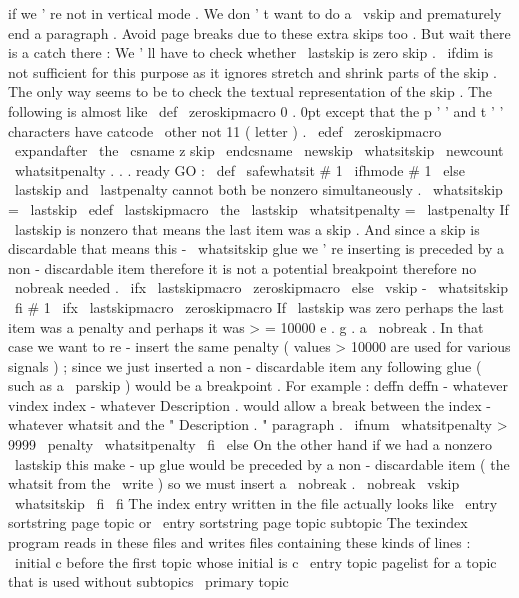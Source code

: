 {{{{if
we
'
re
not
in
vertical
mode
.
We
%
don
'
t
want
to
do
a
\
vskip
and
prematurely
end
a
paragraph
.
%
%
Avoid
page
breaks
due
to
these
extra
skips
too
.
%
%
But
wait
there
is
a
catch
there
:
%
We
'
ll
have
to
check
whether
\
lastskip
is
zero
skip
.
\
ifdim
is
not
%
sufficient
for
this
purpose
as
it
ignores
stretch
and
shrink
parts
%
of
the
skip
.
The
only
way
seems
to
be
to
check
the
textual
%
representation
of
the
skip
.
%
%
The
following
is
almost
like
\
def
\
zeroskipmacro
{
0
.
0pt
}
except
that
%
the
p
'
'
and
t
'
'
characters
have
catcode
\
other
not
11
(
letter
)
.
%
\
edef
\
zeroskipmacro
{
\
expandafter
\
the
\
csname
z
skip
\
endcsname
}
%
\
newskip
\
whatsitskip
\
newcount
\
whatsitpenalty
%
%
.
.
.
ready
GO
:
%
\
def
\
safewhatsit
#
1
{
\
ifhmode
#
1
%
\
else
%
\
lastskip
and
\
lastpenalty
cannot
both
be
nonzero
simultaneously
.
\
whatsitskip
=
\
lastskip
\
edef
\
lastskipmacro
{
\
the
\
lastskip
}
%
\
whatsitpenalty
=
\
lastpenalty
%
%
If
\
lastskip
is
nonzero
that
means
the
last
item
was
a
%
skip
.
And
since
a
skip
is
discardable
that
means
this
%
-
\
whatsitskip
glue
we
'
re
inserting
is
preceded
by
a
%
non
-
discardable
item
therefore
it
is
not
a
potential
%
breakpoint
therefore
no
\
nobreak
needed
.
\
ifx
\
lastskipmacro
\
zeroskipmacro
\
else
\
vskip
-
\
whatsitskip
\
fi
%
#
1
%
%
\
ifx
\
lastskipmacro
\
zeroskipmacro
%
If
\
lastskip
was
zero
perhaps
the
last
item
was
a
penalty
and
%
perhaps
it
was
>
=
10000
e
.
g
.
a
\
nobreak
.
In
that
case
we
want
%
to
re
-
insert
the
same
penalty
(
values
>
10000
are
used
for
various
%
signals
)
;
since
we
just
inserted
a
non
-
discardable
item
any
%
following
glue
(
such
as
a
\
parskip
)
would
be
a
breakpoint
.
For
example
:
%
deffn
deffn
-
whatever
%
vindex
index
-
whatever
%
Description
.
%
would
allow
a
break
between
the
index
-
whatever
whatsit
%
and
the
"
Description
.
"
paragraph
.
\
ifnum
\
whatsitpenalty
>
9999
\
penalty
\
whatsitpenalty
\
fi
\
else
%
On
the
other
hand
if
we
had
a
nonzero
\
lastskip
%
this
make
-
up
glue
would
be
preceded
by
a
non
-
discardable
item
%
(
the
whatsit
from
the
\
write
)
so
we
must
insert
a
\
nobreak
.
\
nobreak
\
vskip
\
whatsitskip
\
fi
\
fi
}
%
The
index
entry
written
in
the
file
actually
looks
like
%
\
entry
{
sortstring
}
{
page
}
{
topic
}
%
or
%
\
entry
{
sortstring
}
{
page
}
{
topic
}
{
subtopic
}
%
The
texindex
program
reads
in
these
files
and
writes
files
%
containing
these
kinds
of
lines
:
%
\
initial
{
c
}
%
before
the
first
topic
whose
initial
is
c
%
\
entry
{
topic
}
{
pagelist
}
%
for
a
topic
that
is
used
without
subtopics
%
\
primary
{
topic
}}}}}
